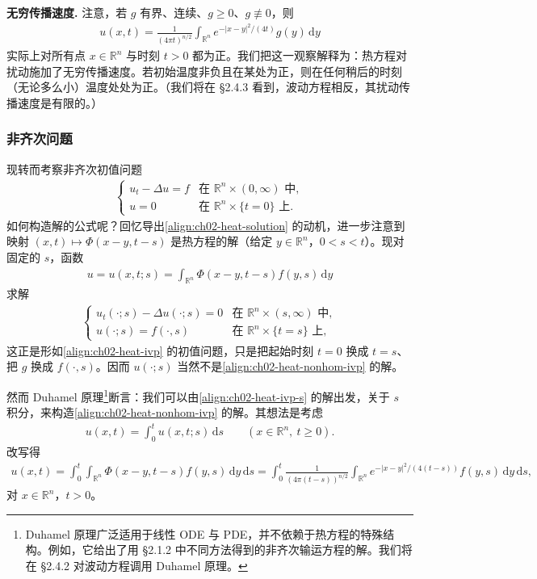 \documentclass[../../main.tex]{subfiles}
\begin{document}
\textbf{无穷传播速度.} 注意，若 $g$ 有界、连续、$g\geqslant 0$、$g\not\equiv 0$，则
\begin{align*}
u(x,t)=\frac{1}{(4\pi t)^{n/2}}\int_{\mathbb{R}^n}e^{-|x-y|^2/(4t)}g(y)\,\mathrm{d}y
\end{align*}
实际上对所有点 $x\in\mathbb{R}^n$ 与时刻 $t>0$ 都为正。我们把这一观察解释为：热方程对扰动施加了无穷传播速度。若初始温度非负且在某处为正，则在任何稍后的时刻（无论多么小）温度处处为正。（我们将在 \S2.4.3 看到，波动方程相反，其扰动传播速度是有限的。）

\subsubsection{非齐次问题}

现转而考察非齐次初值问题
\begin{align}\label{align:ch02-heat-nonhom-ivp}
\begin{cases}
u_t-\Delta u=f & \text{在 }\mathbb{R}^n\times(0,\infty)\text{ 中},\\
u=0 & \text{在 }\mathbb{R}^n\times\{t=0\}\text{ 上}.
\end{cases}
\end{align}
如何构造解的公式呢？回忆导出\eqref{align:ch02-heat-solution} 的动机，进一步注意到映射 $(x,t)\mapsto\Phi(x-y,t-s)$ 是热方程的解（给定 $y\in\mathbb{R}^n$，$0<s<t$）。现对固定的 $s$，函数
\begin{align*}
u=u(x,t;s)=\int_{\mathbb{R}^n}\Phi(x-y,t-s)f(y,s)\,\mathrm{d}y
\end{align*}
求解
\begin{align}\label{align:ch02-heat-ivp-s}
\begin{cases}
u_t(\cdot;s)-\Delta u(\cdot;s)=0 & \text{在 }\mathbb{R}^n\times(s,\infty)\text{ 中},\\
u(\cdot;s)=f(\cdot,s) & \text{在 }\mathbb{R}^n\times\{t=s\}\text{ 上},
\end{cases}
\end{align}
这正是形如\eqref{align:ch02-heat-ivp} 的初值问题，只是把起始时刻 $t=0$ 换成 $t=s$、把 $g$ 换成 $f(\cdot,s)$。因而 $u(\cdot;s)$ 当然不是\eqref{align:ch02-heat-nonhom-ivp} 的解。

然而 Duhamel 原理\footnote{Duhamel 原理广泛适用于线性 ODE 与 PDE，并不依赖于热方程的特殊结构。例如，它给出了用 \S2.1.2 中不同方法得到的非齐次输运方程的解。我们将在 \S2.4.2 对波动方程调用 Duhamel 原理。}断言：我们可以由\eqref{align:ch02-heat-ivp-s} 的解出发，关于 $s$ 积分，来构造\eqref{align:ch02-heat-nonhom-ivp} 的解。其想法是考虑
\begin{align*}
u(x,t)=\int_0^t u(x,t;s)\,\mathrm{d}s \qquad (x\in\mathbb{R}^n,\ t\geqslant 0).
\end{align*}
改写得
\begin{align}\label{align:ch02-heat-duhamel}
u(x,t)=\int_0^t\int_{\mathbb{R}^n}\Phi(x-y,t-s)f(y,s)\,\mathrm{d}y\,\mathrm{d}s
=\int_0^t\frac{1}{(4\pi(t-s))^{n/2}}\int_{\mathbb{R}^n}e^{-|x-y|^2/(4(t-s))}f(y,s)\,\mathrm{d}y\,\mathrm{d}s,
\end{align}
对 $x\in\mathbb{R}^n$，$t>0$。
\end{document}
